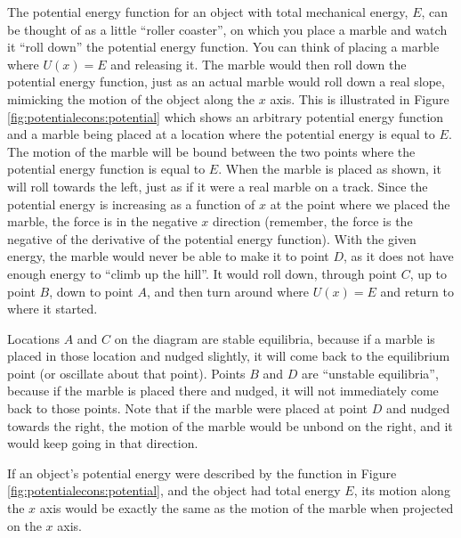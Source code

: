 The potential energy function for an object with total mechanical energy, $E$, can be thought of as a little ``roller coaster'', on which you place a marble and watch it ``roll down'' the potential energy function. You can think of placing a marble where $U(x)=E$ and releasing it. The marble would then roll down the potential energy function, just as an actual marble would roll down a real slope, mimicking the motion of the object along the $x$ axis. This is illustrated in Figure \ref{fig:potentialecons:potential} which shows an arbitrary potential energy function and a marble being placed at a location where the potential energy is equal to $E$.
The motion of the marble will be bound between the two points where the potential energy function is equal to $E$. When the marble is placed as shown, it will roll towards the left, just as if it were a real marble on a track. Since the potential energy is increasing as a function of $x$ at the point where we placed the marble, the force is in the negative $x$ direction (remember, the force is the negative of the derivative of the potential energy function). With the given energy, the marble would never be able to make it to point $D$, as it does not have enough energy to ``climb up the hill''. It would roll down, through point $C$, up to point $B$, down to point $A$, and then turn around where $U(x)=E$ and return to where it started. 

Locations $A$ and $C$ on the diagram are stable equilibria, because if a marble is placed in those location and nudged slightly, it will come back to the equilibrium point (or oscillate about that point). Points $B$ and $D$ are ``unstable equilibria'', because if the marble is placed there and nudged, it will not immediately come back to those points. Note that if the marble were placed at point $D$ and nudged towards the right, the motion of the marble would be unbond on the right, and it would keep going in that direction. 

If an object's potential energy were described by the function in Figure \ref{fig:potentialecons:potential}, and the object had total energy $E$, its motion along the $x$ axis would be exactly the same as the motion of the marble when projected on the $x$ axis. 


